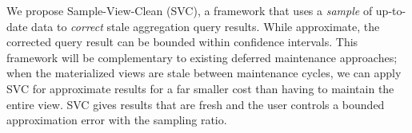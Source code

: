 




We propose Sample-View-Clean (SVC), a framework that uses a \emph{sample} of up-to-date data to \emph{correct} stale aggregation query results.
While approximate, the corrected query result can be bounded within confidence intervals.
This framework will be complementary to existing deferred maintenance approaches; when the materialized views are stale between maintenance cycles, we can apply SVC for approximate results for a far smaller cost than having to maintain the entire view.
SVC gives results that are fresh and the user controls a bounded approximation error with the sampling ratio.

